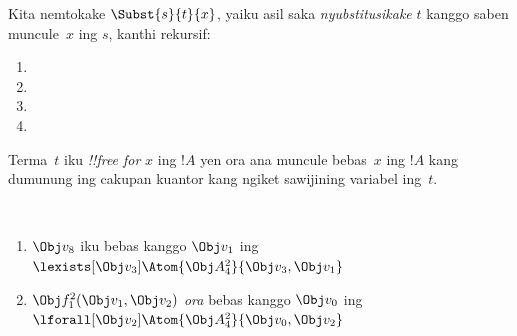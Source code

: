 \documentclass[../../../include/open-logic-section]{subfiles}
\begin{document}


\begin{defn}
Kita nemtokake $\Subst{s}{t}{x}$, yaiku asil saka \emph{nyubstitusikake}
$t$ kanggo saben muncule~$x$ ing $s$, kanthi rekursif:
\begin{enumerate}
\item {}

\item {}

\item {}

\item{}
\end{enumerate}
\end{defn}

\begin{defn}
Terma~$t$ iku \emph{!!{free for}} $x$ ing $!A$ yen ora ana muncule
bebas~$x$ ing $!A$ kang dumunung ing cakupan kuantor kang ngiket
sawijining variabel ing~$t$.
\end{defn}

\begin{ex} ~
\begin{enumerate}
\item $\Obj v_8$ iku bebas kanggo $\Obj v_1$ ing $\lexists[\Obj
  v_3]\Atom{\Obj A^2_4}{\Obj v_3,\Obj v_1}$

\item $\Obj f^2_1(\Obj v_1, \Obj v_2)$ \emph{ora} bebas kanggo $\Obj
  v_0$ ing $\lforall[\Obj v_2]\Atom{\Obj A^2_4}{\Obj v_0,\Obj v_2}$
\end{enumerate}
\end{ex}
\end{document}
